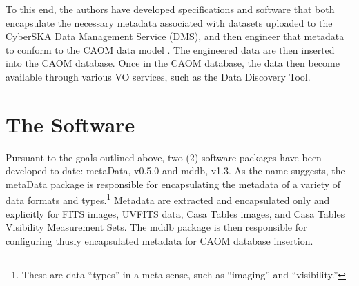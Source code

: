To this end, the authors have developed  specifications and software
that both encapsulate the necessary metadata associated with datasets
uploaded to the  CyberSKA Data Management Service (DMS), and then
engineer that metadata to conform to the CAOM data
model \citep{dowler_2007}. The engineered data are then inserted into
the CAOM database. Once in the CAOM database, the data then become
available through various VO services, such as the Data Discovery Tool. 

\section{The Software}
Pursuant to the goals outlined above, two (2) software packages have
been developed to date: metaData, v0.5.0 and mddb, v1.3. As the name
suggests, the metaData package is responsible for encapsulating
the metadata of a variety of data formats and types.\footnote{These
  are data ``types'' in a meta sense, such as ``imaging'' and ``visibility.''}
Metadata are extracted and encapsulated only and explicitly for FITS
images, UVFITS data, Casa Tables images, and Casa Tables Visibility
Measurement Sets. The mddb package is then responsible for configuring
thusly encapsulated metadata for CAOM database insertion.

